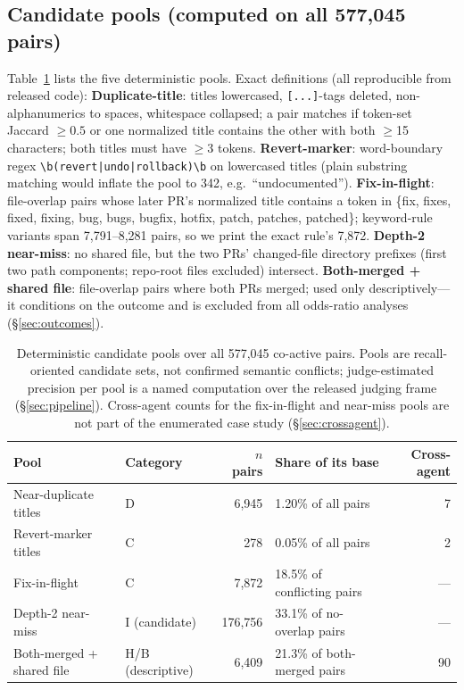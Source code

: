 \documentclass{article}
\begin{document}
\subsection{Candidate pools (computed on all 577{,}045 pairs)}
\label{sec:pooldefs}

Table~\ref{tab:pools} lists the five deterministic pools. Exact definitions (all reproducible from released code):
\textbf{Duplicate-title}: titles lowercased, \texttt{[...]}-tags deleted, non-alphanumerics to spaces, whitespace collapsed; a pair matches if token-set Jaccard $\geq 0.5$ or one normalized title contains the other with both $\geq$15 characters; both titles must have $\geq$3 tokens. %
\textbf{Revert-marker}: word-boundary regex \texttt{\textbackslash b(revert|undo|rollback)\textbackslash b} on lowercased titles (plain substring matching would inflate the pool to 342, e.g.\ ``undocumented''). %
\textbf{Fix-in-flight}: file-overlap pairs whose later PR's normalized title contains a token in \{fix, fixes, fixed, fixing, bug, bugs, bugfix, hotfix, patch, patches, patched\}; keyword-rule variants span 7{,}791--8{,}281 pairs, so we print the exact rule's 7{,}872. %
\textbf{Depth-2 near-miss}: no shared file, but the two PRs' changed-file directory prefixes (first two path components; repo-root files excluded) intersect. %
\textbf{Both-merged + shared file}: file-overlap pairs where both PRs merged; used only descriptively---it conditions on the outcome and is excluded from all odds-ratio analyses (\S\ref{sec:outcomes}).

\begin{table}[t]
\centering
\caption{Deterministic candidate pools over all 577{,}045 co-active pairs. Pools are recall-oriented candidate sets, not confirmed semantic conflicts; judge-estimated precision per pool is a named computation over the released judging frame (\S\ref{sec:pipeline}). Cross-agent counts for the fix-in-flight and near-miss pools are not part of the enumerated case study (\S\ref{sec:crossagent}).}
\label{tab:pools}
\small
\begin{tabular}{@{}llrlr@{}}
\toprule
Pool & Category & $n$ pairs & Share of its base & Cross-agent \\
\midrule
Near-duplicate titles & D & 6{,}945 & 1.20\% of all pairs & 7 \\ %
Revert-marker titles & C & 278 & 0.05\% of all pairs & 2 \\ %
Fix-in-flight & C & 7{,}872 & 18.5\% of conflicting pairs & --- \\ %
Depth-2 near-miss & I (candidate) & 176{,}756 & 33.1\% of no-overlap pairs & --- \\ %
Both-merged + shared file & H/B (descriptive) & 6{,}409 & 21.3\% of both-merged pairs & 90 \\ %
\bottomrule
\end{tabular}
\end{table}
\end{document}
